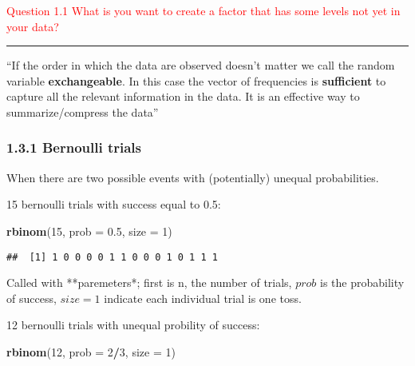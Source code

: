 \documentclass[]{article}
\newenvironment{Shaded}{\begin{snugshade}}{\end{snugshade}}
\newcommand{\KeywordTok}[1]{\textcolor[rgb]{0.13,0.29,0.53}{\textbf{#1}}}
\newcommand{\DataTypeTok}[1]{\textcolor[rgb]{0.13,0.29,0.53}{#1}}
\newcommand{\DecValTok}[1]{\textcolor[rgb]{0.00,0.00,0.81}{#1}}
\newcommand{\FloatTok}[1]{\textcolor[rgb]{0.00,0.00,0.81}{#1}}
\newcommand{\StringTok}[1]{\textcolor[rgb]{0.31,0.60,0.02}{#1}}
\newcommand{\OperatorTok}[1]{\textcolor[rgb]{0.81,0.36,0.00}{\textbf{#1}}}
\newcommand{\NormalTok}[1]{#1}
\let\oldrule=\rule
\renewcommand{\rule}[1]{\oldrule{\linewidth}}
\begin{document}
\textcolor{red}{Question 1.1  What is you want to create a factor that has some levels not yet in your data?}

\begin{Shaded}
\end{Shaded}

\begin{center}\rule{0.5\linewidth}{\linethickness}\end{center}

``If the order in which the data are observed doesn't matter we call the
random variable \textbf{exchangeable}. In this case the vector of
frequencies is \textbf{sufficient} to capture all the relevant
information in the data. It is an effective way to summarize/compress
the data''

\subsubsection{1.3.1 Bernoulli trials}\label{bernoulli-trials}

When there are two possible events with (potentially) unequal
probabilities.

15 bernoulli trials with success equal to 0.5:

\begin{Shaded}
\begin{Highlighting}[]
\KeywordTok{rbinom}\NormalTok{(}\DecValTok{15}\NormalTok{, }\DataTypeTok{prob =} \FloatTok{0.5}\NormalTok{, }\DataTypeTok{size =} \DecValTok{1}\NormalTok{)}
\end{Highlighting}
\end{Shaded}

\begin{verbatim}
##  [1] 1 0 0 0 0 1 1 0 0 0 1 0 1 1 1
\end{verbatim}

Called with **paremeters*; first is n, the number of trials, \(prob\) is
the probability of success, \(size = 1\) indicate each individual trial
is one toss.

12 bernoulli trials with unequal probility of success:

\begin{Shaded}
\begin{Highlighting}[]
\KeywordTok{rbinom}\NormalTok{(}\DecValTok{12}\NormalTok{, }\DataTypeTok{prob =} \DecValTok{2}\OperatorTok{/}\DecValTok{3}\NormalTok{, }\DataTypeTok{size =} \DecValTok{1}\NormalTok{)}
\end{Highlighting}
\end{Shaded}
\end{document}
